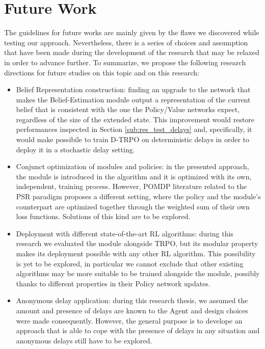     \section{Future Work}
    \label{conc:future}
        The guidelines for future works are mainly given by the flaws we discovered while testing our approach. Nevertheless, there is a series of choices and assumption that have been made during the development of the research that may be relaxed in order to advance further. To summarize, we propose the following research directions for future studies on this topic and on this research:
        \begin{itemize}
            \item Belief Representation construction: finding an upgrade to the network that makes the Belief-Estimation module output a representation of the current belief that is consistent with the one the Policy/Value networks expect, regardless of the size of the extended state. This improvement would restore performances inspected in Section \ref{sub:res_test_delays} and, specifically, it would make possibile to train D-TRPO on deterministic delays in order to deploy it in a stochastic delay setting.
            \item Conjunct optimization of modules and policies: in the presented approach, the module is introduced in the algorithm and it is optimized with its own, independent, training process. However, POMDP literature related to the PSR paradigm proposes a different setting, where the policy and the module's counterpart are optimized together through the weighted sum of their own loss functions. Solutions of this kind are to be explored.
            \item Deployment with different state-of-the-art RL algorithms: during this research we evaluated the module alongside TRPO, but its modular property makes its deployment possible with any other RL algorithm. This possibility is yet to be explored, in particular we cannot exclude that other existing algorithms may be more suitable to be trained alongside the module, possibly thanks to different properties in their Policy network updates.
            \item Anonymous delay application: during this research thesis, we assumed the amount and presence of delays are known to the Agent and design choices were made consequently. However, the general purpose is to develope an approach that is able to cope with the presence of delays in any situation and anonymous delays still have to be explored.
        \end{itemize}